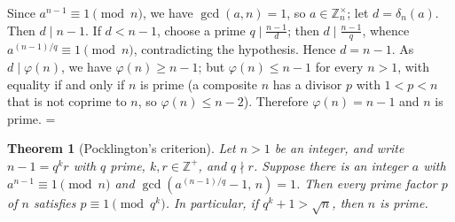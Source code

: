 \documentclass[11pt]{article}
\makeatletter
\theoremstyle{ntstyle}
\newtheorem{theorem}{Theorem}[subsection]
\let\nt@closedisplay\]
\def\nt@guardedclose{\@ifnextchar\par{\nt@closeafterpar}{\@ifnextchar\end{\postdisplaypenalty\@M\nt@closedisplay}{\nt@closedisplay}}}
\def\nt@closeafterpar\par{\@ifnextchar\par{\nt@closeafterpar}{\@ifnextchar\end{\postdisplaypenalty\@M\nt@closedisplay\par}{\nt@closedisplay\par}}}
\renewenvironment{proof}[1][\proofname]{\par
  \pushQED{\qed}\normalfont\topsep\medskipamount\edef\nt@afterproof{\@endparpenalty=\the\@endparpenalty\relax}\@beginparpenalty\@M\@endparpenalty\@M\let\]\nt@guardedclose\trivlist\item[]\textit{#1\@addpunct{.}} \ignorespaces}{\ifvmode\addpenalty\@M\fi\popQED\nt@afterproof\endtrivlist\@endpefalse}
\newcommand{\ZmodUnits}[1]{\mathbb{Z}_{#1}^{\times}}
\makeatother
\begin{document}
\begin{proof} Since $a^{n-1}\equiv1\pmod{n}$,
	we have $\gcd(a, n)=1$, so $a\in\ZmodUnits{n}$; let
	$d=\delta_n(a)$. Then $d\mid n-1$. If $d<n-1$, choose a
	prime $q\mid\tfrac{n-1}{d}$; then $d\mid\tfrac{n-1}{q}$, whence
	$a^{(n-1)/q}\equiv1\pmod{n}$, contradicting the hypothesis. Hence
	$d=n-1$. As $d\mid\varphi(n)$, we have $\varphi(n)\ge n-1$; but $\varphi(n)\le n-1$ for every
	$n>1$, with equality if and only if $n$ is prime (a composite $n$ has a divisor $p$ with $1<p<n$
	that is not coprime to $n$, so $\varphi(n)\le n-2$). Therefore $\varphi(n)=n-1$ and $n$ is prime.
\end{proof}
\begin{theorem}[Pocklington's criterion]\label{thm:9.1.9} Let
	$n>1$ be an integer, and write $n-1=q^{k}r$ with $q$ prime,
	$k,r\in\mathbb{Z}^+$, and $q\nmid r$. Suppose there is an
	integer $a$ with $a^{n-1}\equiv1\pmod{n}$ and
	$\gcd\left(a^{(n-1)/q}-1,\,n\right)=1$. Then every prime factor $p$
	of $n$ satisfies $p\equiv1\pmod{q^{k}}$.
	In particular, if $q^k+1>\sqrt n$, then $n$ is prime.
\end{theorem}
\end{document}
